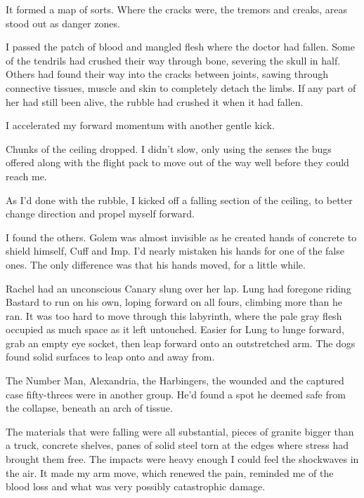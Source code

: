 It formed a map of sorts.  Where the cracks were, the tremors and creaks, areas stood out as danger zones.



I passed the patch of blood and mangled flesh where the doctor had fallen.  Some of the tendrils had crushed their way through bone, severing the skull in half.  Others had found their way into the cracks between joints, sawing through connective tissues, muscle and skin to completely detach the limbs.  If any part of her had still been alive, the rubble had crushed it when it had fallen.



I accelerated my forward momentum with another gentle kick.



Chunks of the ceiling dropped.  I didn't slow, only using the senses the bugs offered along with the flight pack to move out of the way well before they could reach me.



As I'd done with the rubble, I kicked off a falling section of the ceiling, to better change direction and propel myself forward.



I found the others.  Golem was almost invisible as he created hands of concrete to shield himself, Cuff and Imp.  I'd nearly mistaken his hands for one of the false ones.  The only difference was that his hands moved, for a little while.



Rachel had an unconscious Canary slung over her lap.  Lung had foregone riding Bastard to run on his own, loping forward on all fours, climbing more than he ran.  It was too hard to move through this labyrinth, where the pale gray flesh occupied as much space as it left untouched.  Easier for Lung to lunge forward, grab an empty eye socket, then leap forward onto an outstretched arm.  The dogs found solid surfaces to leap onto and away from.



The Number Man, Alexandria, the Harbingers, the wounded and the captured case fifty-threes were in another group.  He'd found a spot he deemed safe from the collapse, beneath an arch of tissue.



The materials that were falling were all substantial, pieces of granite bigger than a truck, concrete shelves, panes of solid steel torn at the edges where stress had brought them free.  The impacts were heavy enough I could feel the shockwaves in the air.  It made my arm move, which renewed the pain, reminded me of the blood loss and what was very possibly catastrophic damage.



